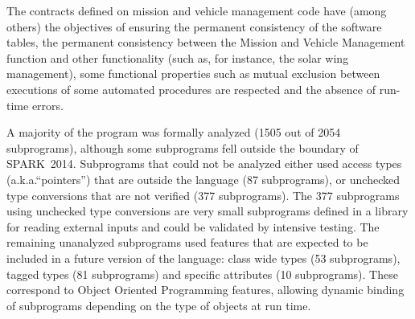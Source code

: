 \documentclass[10pt,a4paper,twocolumn]{article}
\newcommand{\newspark}{SPARK~2014\xspace}
\newcommand{\aka}{a.k.a.\xspace}
\begin{document}
The contracts defined on mission and vehicle management code have
(among others) the objectives of ensuring the permanent consistency of
the software tables, the permanent consistency between the Mission and
Vehicle Management function and other functionality (such as, for
instance, the solar wing management), some functional properties such
as mutual exclusion between executions of some automated procedures
are respected and the absence of run-time errors.


A majority of the program was formally analyzed (1505 out of 2054
subprograms), although some subprograms fell outside the boundary of
\newspark.  Subprograms that could not be analyzed either used access
types (\aka ``pointers'') that are outside the language (87
subprograms), or unchecked type conversions that are not verified (377
subprograms).  The 377 subprograms using unchecked type conversions
are very small subprograms defined in a library for reading external
inputs and could be validated by intensive testing. The remaining
unanalyzed subprograms used features that are expected to be included
in a future version of the language: class wide types (53
subprograms), tagged types (81 subprograms) and specific attributes
(10 subprograms). These correspond to Object Oriented Programming
features, allowing dynamic binding of subprograms depending on the
type of objects at run time.


\end{document}
